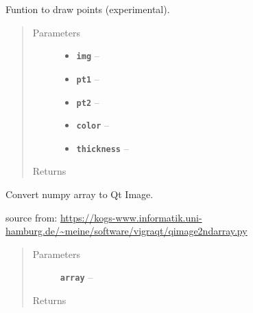 \documentclass[letterpaper,10pt,english]{sphinxmanual}
\begin{document}
\begin{fulllineitems}
\label{RRtoolbox.lib:RRtoolbox.lib.image.myline}
Funtion to draw points (experimental).
\begin{quote}\begin{description}
\item[{Parameters}] \leavevmode\begin{itemize}
\item {} 
\textbf{\texttt{img}} -- 

\item {} 
\textbf{\texttt{pt1}} -- 

\item {} 
\textbf{\texttt{pt2}} -- 

\item {} 
\textbf{\texttt{color}} -- 

\item {} 
\textbf{\texttt{thickness}} -- 

\end{itemize}

\item[{Returns}] \leavevmode


\end{description}\end{quote}

\end{fulllineitems}


\begin{fulllineitems}
\label{RRtoolbox.lib:RRtoolbox.lib.image.np2qi}
Convert numpy array to Qt Image.

source from: \href{https://kogs-www.informatik.uni-hamburg.de/~meine/software/vigraqt/qimage2ndarray.py}{https://kogs-www.informatik.uni-hamburg.de/\textasciitilde{}meine/software/vigraqt/qimage2ndarray.py}
\begin{quote}\begin{description}
\item[{Parameters}] \leavevmode
\textbf{\texttt{array}} -- 

\item[{Returns}] \leavevmode


\end{description}\end{quote}

\end{fulllineitems}
\end{document}
